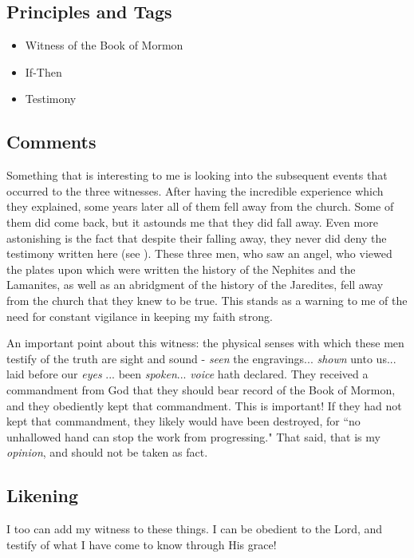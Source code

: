 \documentclass[12pt]{report}
\begin{document}
\subsection{Principles and Tags\label{3witness:principles}}
\begin{itemize}
\item {}Witness of the Book of Mormon
\item {}If-Then
\item {}Testimony
\end{itemize}

\subsection{Comments\label{3witness:comments}}
Something that is interesting to me is looking into the subsequent events that occurred to the three witnesses.  After having the incredible experience which they explained, some years later all of them fell away from the church.  Some of them did come back, but it astounds me that they did fall away.  Even more astonishing is the fact that despite their falling away, they never did deny the testimony written here (see ).  These three men, who saw an angel, who viewed the plates upon which were written the history of the Nephites and the Lamanites, as well as an abridgment of the history of the Jaredites, fell away from the church that they knew to be true.  This stands as a warning to me of the need for constant vigilance in keeping my faith strong.

An important point about this witness: the physical senses with which these men testify of the truth are sight and sound - \emph{seen} the engravings... \emph{shown} unto us... laid before our \emph{eyes} ... been \emph{spoken}... \emph{voice} hath declared.  They received a commandment from God that they should bear record of the Book of Mormon, and they obediently kept that commandment.  This is important!  If they had not kept that commandment, they likely would have been destroyed, for ``no unhallowed hand can stop the work from progressing."  That said, that is my \emph{opinion}, and should not be taken as fact.

\subsection{Likening\label{3witness:likening}}
I too can add my witness to these things.  I can be obedient to the Lord, and testify of what I have come to know through His grace!
\end{document}
